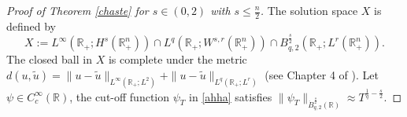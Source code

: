 \documentclass[preprint,compress,12pt]{elsarticle}
\numberwithin{equation}{section}
\begin{document}
\begin{proof}[Proof of Theorem \ref{chaste} for $s\in(0,2)$ with $s\leq \frac{n}{2}$]
	The solution space $X$ is defined by
	\begin{equation}
		X:=L^{\infty}(\mathbb{R}_{+};H^{s}(\mathbb{R}_{+}^n))\cap L^{q}(\mathbb{R}_{+};W^{s,r}(\mathbb{R}_{+}^n))\cap B^{\frac{s}{2}}_{q,2}(\mathbb{R}_{+};L^{r}(\mathbb{R}_{+}^n)).
	\end{equation}
	The closed ball in $X$ is complete under the metric $d(u,\tilde{u})=\|u-\tilde{u}\|_{L^{\infty}(\mathbb{R}_{+};L^{2})}+\|u-\tilde{u}\|_{L^{q}(\mathbb{R}_{+};L^{r})}$ (see Chapter 4 of \cite{facetious}). Let $\psi\in C_{c}^{\infty}(\mathbb{R})$, the cut-off function $\psi_{T}$ in \eqref{ahha} satisfies $\|\psi_{T}\|_{\dot{B}^{\frac{s}{2}}_{q,2}(\mathbb{R})}\approx T^{\frac{1}{q}-\frac{s}{2}}$.
	

\end{proof}
\end{document}
